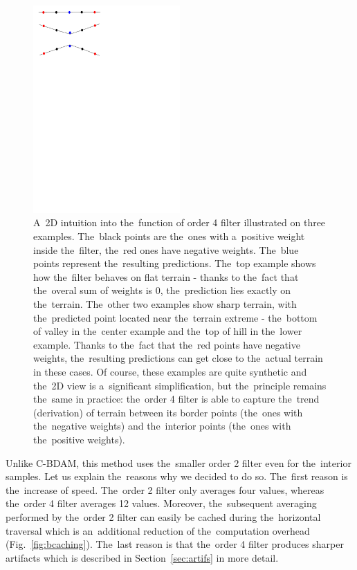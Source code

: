 \begin{figure}
	\includegraphics[trim={0 21cm 10cm 0}, clip, width=0.5\textwidth]{figures/order4_flat.pdf}\centering
	\caption{A~2D intuition into the~function of order 4 filter illustrated on three examples. The~black points are the~ones with a~positive weight inside the~filter, the~red ones have negative weights. The~blue points represent the~resulting predictions. The~top example shows how the~filter behaves on flat terrain - thanks to the~fact that the~overal sum of weights is 0, the~prediction lies exactly on the~terrain. The~other two examples show sharp terrain, with the~predicted point located near the~terrain extreme - the~bottom of valley in the~center example and the~top of hill in the~lower example. Thanks to the~fact that the~red points have negative weights, the~resulting predictions can get close to the~actual terrain in these cases. Of course, these examples are quite synthetic and the~2D view is a~significant simplification, but the~principle remains the~same in practice: the~order 4 filter is able to capture the~trend (derivation) of terrain between its border points (the~ones with the~negative weights) and the~interior points (the~ones with the~positive weights).}
	\label{fig:order4_hills}
\end{figure}

Unlike C-BDAM, this method uses the~smaller order 2 filter even for the~interior samples. Let us explain the~reasons why we decided to do so. The~first reason is the~increase of speed. The~order 2 filter only averages four values, whereas the~order 4 filter averages 12 values. Moreover, the~subsequent averaging performed by the~order 2 filter can easily be cached during the~horizontal traversal which is an~additional reduction of the~computation overhead (Fig.~\ref{fig:bcaching}). The~last reason is that the~order 4 filter produces sharper artifacts which is described in Section~\ref{sec:artifs} in more detail.

